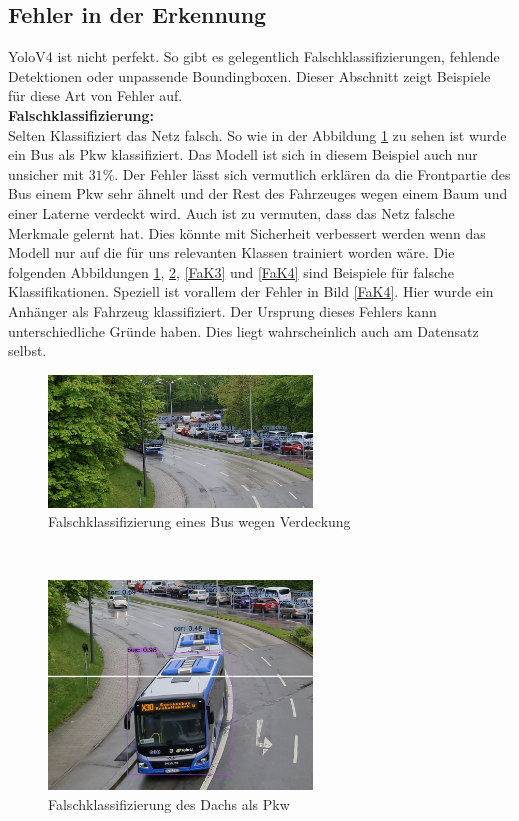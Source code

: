 \documentclass[conference]{IEEEtran}
\begin{document}
	\subsection{Fehler in der Erkennung}
	YoloV4 ist nicht perfekt. So gibt es gelegentlich Falschklassifizierungen, fehlende Detektionen oder unpassende Boundingboxen. Dieser Abschnitt zeigt Beispiele für diese Art von Fehler auf.\\
	\textbf{Falschklassifizierung:}\\
	Selten Klassifiziert das Netz falsch. So wie in der Abbildung \ref{FaK} zu sehen ist wurde ein Bus als Pkw klassifiziert. Das Modell ist sich in diesem Beispiel auch nur unsicher mit $31\%$. Der Fehler lässt sich vermutlich erklären da die Frontpartie des Bus einem Pkw sehr ähnelt und der Rest des Fahrzeuges wegen einem Baum und einer Laterne verdeckt wird. Auch ist zu vermuten, dass das Netz falsche Merkmale gelernt hat. Dies könnte mit Sicherheit verbessert werden wenn das Modell nur auf die für uns relevanten Klassen trainiert worden wäre. Die folgenden Abbildungen \ref{FaK}, \ref{FaK2}, \ref{FaK3} und \ref{FaK4} sind Beispiele für falsche Klassifikationen. Speziell ist vorallem der Fehler in Bild \ref{FaK4}. Hier wurde ein Anhänger als Fahrzeug klassifiziert. Der Ursprung dieses Fehlers kann unterschiedliche Gründe haben. Dies liegt wahrscheinlich auch am Datensatz selbst.
	\begin{figure}[!h]
		\begin{center}
			\includegraphics[width=7cm]{Media/Output_480 - Kopie.jpg}
			\caption{Falschklassifizierung eines Bus wegen Verdeckung}
			\label{FaK}
		\end{center}
	\end{figure}\\
	\begin{figure}[!h]
		\begin{center}
			\includegraphics[width=7cm]{Media/Output_847 - Kopie.jpg}
			\caption{Falschklassifizierung des Dachs als Pkw}
			\label{FaK2}
		\end{center}
	\end{figure}\\
\end{document}
